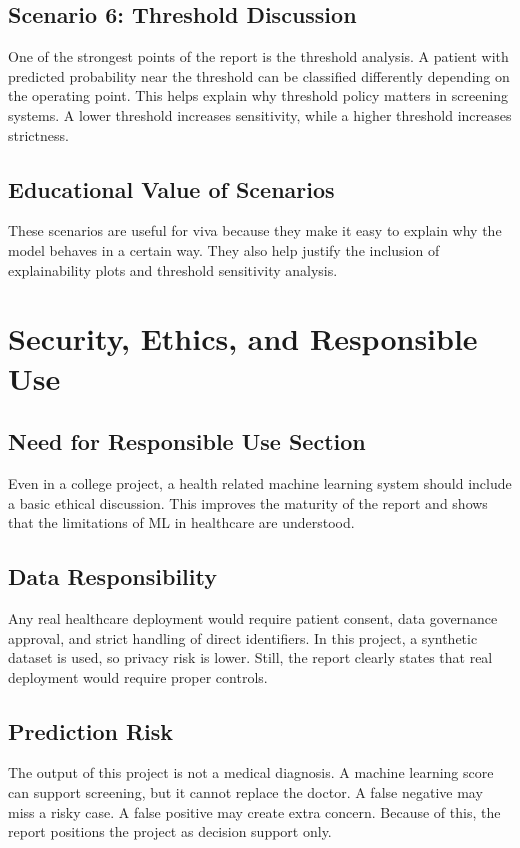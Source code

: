 \documentclass[12pt,a4paper,openany]{report}
\begin{document}
    \section{Scenario 6: Threshold Discussion}
    One of the strongest points of the report is the threshold analysis. A patient with predicted probability near the threshold can be classified differently depending on the operating point. This helps explain why threshold policy matters in screening systems. A lower threshold increases sensitivity, while a higher threshold increases strictness.

    \section{Educational Value of Scenarios}
    These scenarios are useful for viva because they make it easy to explain why the model behaves in a certain way. They also help justify the inclusion of explainability plots and threshold sensitivity analysis.

    \chapter{Security, Ethics, and Responsible Use}
    \section{Need for Responsible Use Section}
    Even in a college project, a health related machine learning system should include a basic ethical discussion. This improves the maturity of the report and shows that the limitations of ML in healthcare are understood.

    \section{Data Responsibility}
    Any real healthcare deployment would require patient consent, data governance approval, and strict handling of direct identifiers. In this project, a synthetic dataset is used, so privacy risk is lower. Still, the report clearly states that real deployment would require proper controls.

    \section{Prediction Risk}
    The output of this project is not a medical diagnosis. A machine learning score can support screening, but it cannot replace the doctor. A false negative may miss a risky case. A false positive may create extra concern. Because of this, the report positions the project as decision support only.
\end{document}

